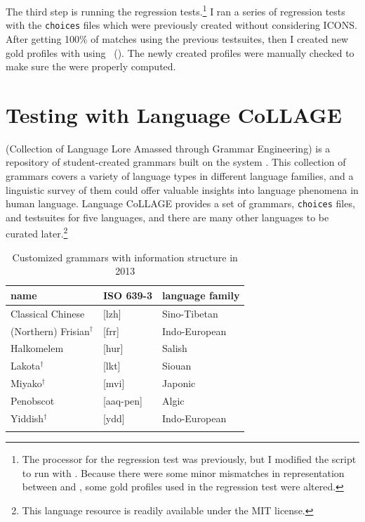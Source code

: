 The third step is running the regression tests.\footnote{The processor
  for the regression test was {\isi{\lkb}} previously, but I modified
  the script to run with \isi{\ace}. Because there were some minor
  mismatches in representation between \isi{\lkb} and \isi{\ace}, some
  gold profiles used in the regression test were altered.}  I ran a series of 
regression tests with the \texttt{choices} files 
which were previously created without considering ICONS.
After getting 100\% of matches using the previous
testsuites, then I created new gold profiles with  using
\isi{\ace}~().  The newly
created profiles were manually checked to make sure the 
were properly computed.



\section{Testing with Language CoLLAGE}
\label{12:sec:collage}

 (Collection of Language Lore Amassed through
Grammar Engineering) is a repository of student-created grammars built
on the \lingo {} system \citep{bender:14}.  This
collection of grammars covers a variety of language types in different
language families, and a linguistic survey of them could offer
valuable insights into language phenomena in human language.  Language
CoLLAGE provides a set of grammars,
\texttt{choices} files, and testsuites for five languages, and there
are many other languages to be curated later.\footnote{This language resource
is readily available under the MIT license.}



\begin{table}[!t]
\small
\centering
\caption{Customized grammars with information structure in 2013}
\label{tbl:ling567:2013}
\begin{tabular}{lll}
\lsptoprule
\textbf{name} & \textbf{ISO 639-3} & \textbf{language family} \\ \hline
\midrule 
Classical Chinese & [lzh] & Sino-Tibetan\\ 
(Northern) Frisian$^\ensuremath{\dagger}$ & [frr] & Indo-European\\ 
Halkomelem & [hur] & Salish\\ 
Lakota$^\ensuremath{\dagger}$ & [lkt] & Siouan\\ 
Miyako$^\ensuremath{\dagger}$ & [mvi] & Japonic\\ 
Penobscot & [aaq-pen] & Algic\\ 
Yiddish$^\ensuremath{\dagger}$ & [ydd]	& Indo-European\\ 
\lspbottomrule
\end{tabular}
\end{table}


